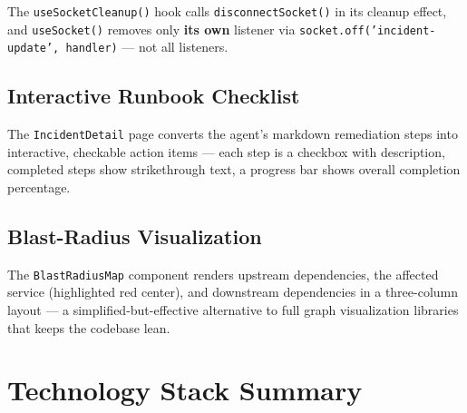 \documentclass[11pt,a4paper]{article}
\begin{document}
The \texttt{useSocketCleanup()} hook calls \texttt{disconnectSocket()} in its cleanup
effect, and \texttt{useSocket()} removes only \textbf{its own} listener via
\texttt{socket.off('incident-update', handler)} — not all listeners.

\subsection{Interactive Runbook Checklist}

The \texttt{IncidentDetail} page converts the agent's markdown remediation steps into
interactive, checkable action items — each step is a checkbox with description, completed
steps show strikethrough text, a progress bar shows overall completion percentage.

\subsection{Blast-Radius Visualization}

The \texttt{BlastRadiusMap} component renders upstream dependencies, the affected service (highlighted red center), and downstream dependencies in a three-column layout — a simplified-but-effective alternative to full graph visualization libraries that keeps the codebase lean.

\section{Technology Stack Summary}
\end{document}
